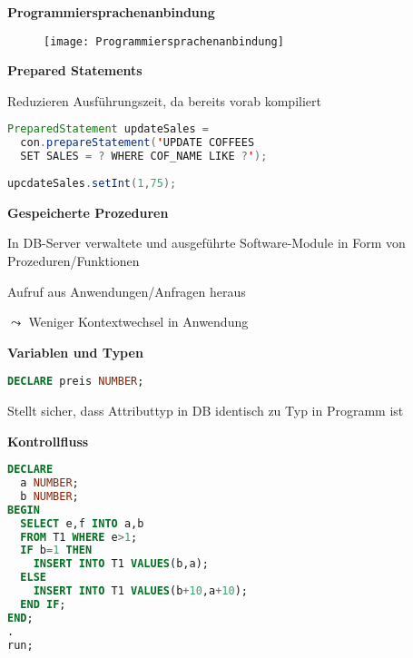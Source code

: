 \textbf{Programmiersprachenanbindung}
\begin{figure}[H]\centering\label{Programmiersprachenanbindung}\texttt{[image: Programmiersprachenanbindung]}\end{figure}

\textbf{Prepared Statements}
\begin{items}
	\item Reduzieren Ausführungszeit, da bereits vorab kompiliert
	\item
		\begin{lstlisting}[language=java,showstringspaces=false]
PreparedStatement updateSales = 
  con.prepareStatement('UPDATE COFFEES 
  SET SALES = ? WHERE COF_NAME LIKE ?');
		\end{lstlisting}
	\item \lstinline[language=java]{upcdateSales.setInt(1,75);}
\end{items}

\textbf{Gespeicherte Prozeduren}
\begin{items}
	\item In DB-Server verwaltete und ausgeführte Software-Module in Form von Prozeduren/Funktionen
	\item Aufruf aus Anwendungen/Anfragen heraus
	\item \( \leadsto \) Weniger Kontextwechsel in Anwendung
\end{items}

\textbf{Variablen und Typen}
\begin{items}
	\item \lstinline[language=sql]{DECLARE preis NUMBER;}
	\item Stellt sicher, dass Attributtyp in DB identisch zu Typ in Programm ist
\end{items}

\textbf{Kontrollfluss}
\begin{items}
	\item
	\begin{lstlisting}[language=sql]
DECLARE
  a NUMBER;
  b NUMBER;
BEGIN
  SELECT e,f INTO a,b
  FROM T1 WHERE e>1;
  IF b=1 THEN
    INSERT INTO T1 VALUES(b,a);
  ELSE
    INSERT INTO T1 VALUES(b+10,a+10);
  END IF;
END;
.
run;
	\end{lstlisting}
\end{items}


